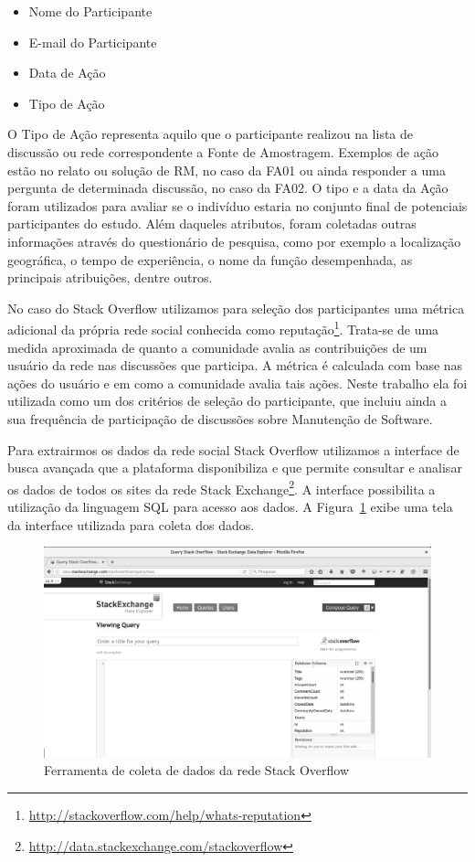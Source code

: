 \begin{itemize}
	\item Nome do Participante
	\item E-mail do Participante
	\item Data de Ação
	\item Tipo de Ação
\end{itemize}

O Tipo de Ação representa aquilo que o participante realizou na lista de
discussão ou rede correspondente a Fonte de Amostragem. Exemplos de ação estão no
relato ou solução de RM, no caso da FA01 ou ainda responder a uma pergunta de
determinada discussão, no caso da FA02. O tipo e a data da Ação foram utilizados
para avaliar se o indivíduo estaria no conjunto final de potenciais
participantes do estudo. Além daqueles atributos, foram coletadas outras
informações através do questionário de pesquisa, como por exemplo a localização
geográfica, o tempo de experiência, o nome da função desempenhada, as principais
atribuições, dentre outros.

No caso do Stack Overflow utilizamos para seleção dos participantes uma métrica
adicional da própria rede social conhecida como
reputação\footnote{\url{http://stackoverflow.com/help/whats-reputation}}.
Trata-se de uma medida aproximada de quanto a comunidade avalia as contribuições
de um usuário da rede nas discussões que participa. A métrica é calculada com
base nas ações do usuário e em como a comunidade avalia tais ações. Neste
trabalho ela foi utilizada como um dos critérios de seleção do participante, que
incluiu ainda a sua frequência de participação de discussões sobre Manutenção de
Software.

Para extrairmos os dados da rede social Stack Overflow utilizamos a interface de
busca avançada que a plataforma disponibiliza e que permite consultar e analisar
os dados de todos os sites da rede Stack
Exchange\footnote{\url{http://data.stackexchange.com/stackoverflow}}. A
interface possibilita a utilização da linguagem SQL para acesso aos dados. A
Figura~\ref{fig:stack-exchange} exibe uma tela da interface utilizada para
coleta dos dados.

\begin{figure}[htpb]
	\centering
	\includegraphics[width=0.7\linewidth]{./chapter-pesquisa-com-profissionais/img/stack-exchange.png}
	\caption{Ferramenta de coleta de dados da rede Stack Overflow}
\label{fig:stack-exchange}
\end{figure}

